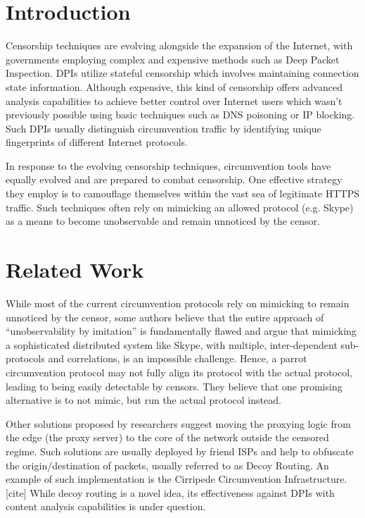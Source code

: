 \section{Introduction}
Censorship techniques are evolving alongside the expansion of the Internet, with governments employing complex and expensive methods such as Deep Packet Inspection. DPIs utilize stateful censorship which involves maintaining connection state information. Although expensive, this kind of censorship offers advanced analysis capabilities to achieve better control over Internet users which wasn't previously possible using basic techniques such as DNS poisoning or IP blocking. Such DPIs usually distinguish circumvention traffic by identifying unique fingerprints of different Internet protocols.

In response to the evolving censorship techniques, circumvention tools have equally evolved and are prepared to combat censorship. One effective strategy they employ is to camouflage themselves within the vast sea of legitimate HTTPS traffic. Such techniques often rely on mimicking an allowed protocol (e.g. Skype) as a means to become unobservable and remain unnoticed by the censor.

\section{Related Work}
While most of the current circumvention protocols rely on mimicking to remain unnoticed by the censor, some authors believe that the entire approach of “unobservability by imitation” is fundamentally flawed and argue that mimicking a sophisticated distributed system like Skype, with multiple, inter-dependent sub-protocols and correlations, is an impossible challenge. Hence, a parrot circumvention protocol may not fully align its protocol with the actual protocol, leading to being easily detectable by censors. They believe that one promising alternative is to not mimic, but run the actual protocol instead.\cite{houmansadr2013parrot}

Other solutions proposed by researchers suggest moving the proxying logic from the edge (the proxy server) to the core of the network outside the censored regime. Such solutions are usually deployed by friend ISPs and help to obfuscate the origin/destination of packets, usually referred to as Decoy Routing. An example of such implementation is the Cirripede Circumvention Infrastructure.[cite] While decoy routing is a novel idea, its effectiveness against DPIs with content analysis capabilities is under question.\cite{karlin2011decoy}\cite{houmansadr2011cirripede}

